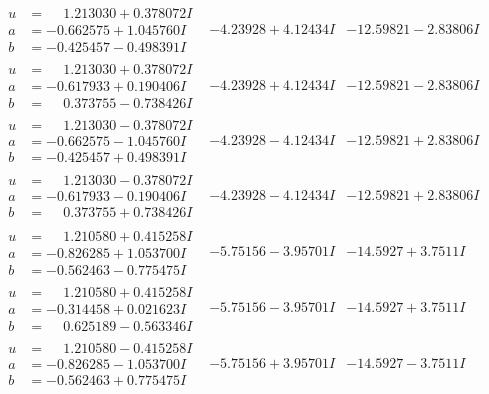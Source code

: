 \documentclass[1p]{elsarticle_modified}
\theoremstyle{definition}
\begin{document}
$$\begin{array}{c|c|c}
\begin{aligned}
u &= \phantom{-}1.213030 + 0.378072 I \\
a &= -0.662575 + 1.045760 I \\
b &= -0.425457 - 0.498391 I\end{aligned}
 & -4.23928 + 4.12434 I & -12.59821 - 2.83806 I \\ \hline\begin{aligned}
u &= \phantom{-}1.213030 + 0.378072 I \\
a &= -0.617933 + 0.190406 I \\
b &= \phantom{-}0.373755 - 0.738426 I\end{aligned}
 & -4.23928 + 4.12434 I & -12.59821 - 2.83806 I \\ \hline\begin{aligned}
u &= \phantom{-}1.213030 - 0.378072 I \\
a &= -0.662575 - 1.045760 I \\
b &= -0.425457 + 0.498391 I\end{aligned}
 & -4.23928 - 4.12434 I & -12.59821 + 2.83806 I \\ \hline\begin{aligned}
u &= \phantom{-}1.213030 - 0.378072 I \\
a &= -0.617933 - 0.190406 I \\
b &= \phantom{-}0.373755 + 0.738426 I\end{aligned}
 & -4.23928 - 4.12434 I & -12.59821 + 2.83806 I \\ \hline\begin{aligned}
u &= \phantom{-}1.210580 + 0.415258 I \\
a &= -0.826285 + 1.053700 I \\
b &= -0.562463 - 0.775475 I\end{aligned}
 & -5.75156 - 3.95701 I & -14.5927 + 3.7511 I \\ \hline\begin{aligned}
u &= \phantom{-}1.210580 + 0.415258 I \\
a &= -0.314458 + 0.021623 I \\
b &= \phantom{-}0.625189 - 0.563346 I\end{aligned}
 & -5.75156 - 3.95701 I & -14.5927 + 3.7511 I \\ \hline\begin{aligned}
u &= \phantom{-}1.210580 - 0.415258 I \\
a &= -0.826285 - 1.053700 I \\
b &= -0.562463 + 0.775475 I\end{aligned}
 & -5.75156 + 3.95701 I & -14.5927 - 3.7511 I \\ \hline\begin{aligned}

\end{aligned}
\end{array}$$
\end{document}
